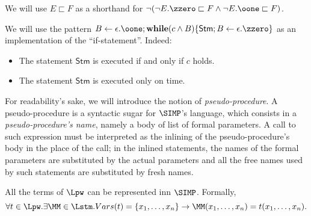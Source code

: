 \begin{notation}
We will use $E\sqsubset F$
as a shorthand for $\neg(\neg E.{\zzero}
\sqsubset F \wedge \neg E.{\oone}
\sqsubset F)$.
\end{notation}


\begin{remark}\label{SFPremark15}
We will use the pattern $B\leftarrow
{\epsilon.\oone};
\mathbf{while}(c\wedge B)\{\textsf{Stm};
B\leftarrow {\epsilon.\zzero}\}$
as an implementation of the
 ``if-statement''. Indeed:
 \begin{itemize}
 \item The statement $\textsf{Stm}$ is executed
 if and only if $c$ holds.
 \item The statement $\textsf{Stm}$ is executed
 only on time.
 \end{itemize}
\end{remark}
%
%
\noindent
For readability's sake, we will introduce
the notion of \emph{pseudo-procedure}.
A pseudo-procedure is a syntactic sugar
for $\SIMP$'s language,
which consists in a \emph{pseudo-procedure's name},
{namely}
a body of list of formal parameters.
{A call to such expression must
be interpreted
as the inlining
of the pseudo-procedure's body in
the place of the call; in the inlined statements,
the names of the formal parameters are substituted by
the actual parameters and all the free
names used by such statements
are substituted by fresh names.}







\begin{lemma}
All the terms of $\Lpw$ can be represented inn
$\SIMP$.
Formally,
$$
\forall t \in \Lpw. \exists \MM \in \Lstm.
Vars(t)=\{x_1,\dots, x_n\} \rightarrow
\MM(x_1,\dots, x_n)=t(x_1,\dots, x_n).
$$
\end{lemma}

